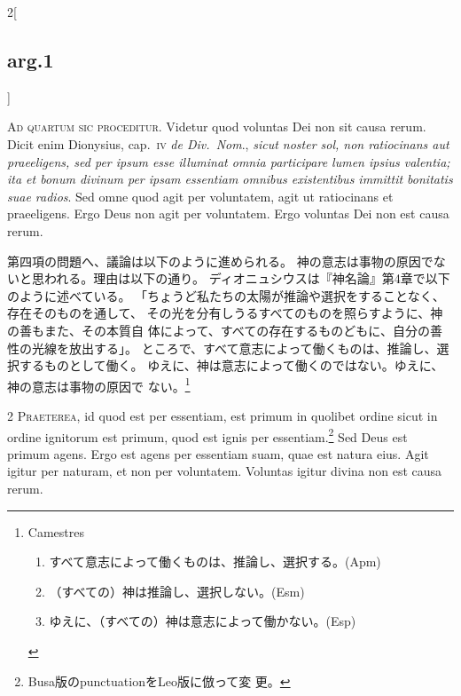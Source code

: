 \documentclass[paper=a4paper,fontsize=10pt,jafontsize=9pt,titlepage]{jlreq}
\begin{document}
\begin{paracol}{2}[\subsection{arg.1}]


{\scshape {\huge A}d quartum sic proceditur}. Videtur quod
 voluntas Dei non sit causa rerum. Dicit enim Dionysius, cap.~{\scshape iv} {\itshape de
 Div.~Nom}., {\itshape sicut noster sol, non ratiocinans aut praeeligens, sed per
 ipsum esse illuminat omnia participare lumen ipsius valentia; ita et
 bonum divinum per ipsam essentiam omnibus existentibus immittit
 bonitatis suae radios}. Sed omne quod agit per voluntatem, agit ut
 ratiocinans et praeeligens. Ergo Deus non agit per voluntatem. Ergo
 voluntas Dei non est causa rerum.

\switchcolumn

第四項の問題へ、議論は以下のように進められる。
 神の意志は事物の原因でないと思われる。理由は以下の通り。
 ディオニュシウスは『神名論』第4章で以下のように述べている。
 「ちょうど私たちの太陽が推論や選択をすることなく、存在そのものを通して、
 その光を分有しうるすべてのものを照らすように、神の善もまた、その本質自
 体によって、すべての存在するものどもに、自分の善性の光線を放出する」。
 ところで、すべて意志によって働くものは、推論し、選択するものとして働く。
 ゆえに、神は意志によって働くのではない。ゆえに、神の意志は事物の原因で
 ない。\footnote{Camestres\begin{enumerate}
		  \item すべて意志によって働くものは、推論し、選択する。(Apm)
		  \item （すべての）神は推論し、選択しない。(Esm)
		  \item ゆえに、（すべての）神は意志によって働かない。(Esp)
		 \end{enumerate}}



{\scshape 2 Praeterea}, id quod est per essentiam, est
 primum in quolibet ordine sicut in ordine ignitorum est primum, quod
 est ignis per essentiam.\footnote{Busa版のpunctuationをLeo版に倣って変
 更。} Sed Deus est primum agens. Ergo est agens per
 essentiam suam, quae est natura eius. Agit igitur per naturam, et non
 per voluntatem. Voluntas igitur divina non est causa rerum.

\switchcolumn


\end{paracol}
\end{document}
